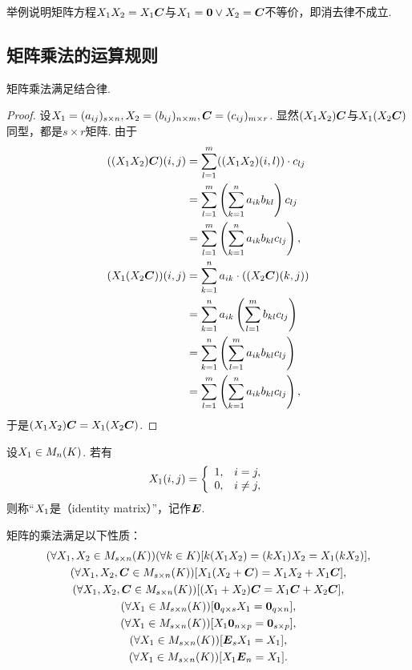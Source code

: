 \begin{example}
举例说明矩阵方程\(X_1 X_2 = X_1 \boldsymbol{C}\)与\(X_1 = \boldsymbol{0} \lor X_2 = \boldsymbol{C}\)不等价，即消去律不成立.
\end{example}

\subsection{矩阵乘法的运算规则}
\begin{theorem}
矩阵乘法满足结合律.
\begin{proof}
设\(X_1 = (a_{ij})_{s \times n},
X_2 = (b_{ij})_{n \times m},
\boldsymbol{C} = (c_{ij})_{m \times r}\).
显然\((X_1X_2)\boldsymbol{C}\)与\(X_1(X_2\boldsymbol{C})\)同型，都是\(s \times r\)矩阵.
由于\begin{align*}
	((X_1X_2)\boldsymbol{C})(i,j)
	&= \sum_{l=1}^m ((X_1X_2)(i,l)) \cdot c_{lj} \\
	&= \sum_{l=1}^m \left( \sum_{k=1}^n a_{ik} b_{kl} \right) c_{lj} \\
	&= \sum_{l=1}^m \left( \sum_{k=1}^n a_{ik} b_{kl} c_{lj} \right), \\
	(X_1(X_2\boldsymbol{C}))(i,j)
	&= \sum_{k=1}^n a_{ik} \cdot ((X_2\boldsymbol{C})(k,j)) \\
	&= \sum_{k=1}^n a_{ik} \left( \sum_{l=1}^m b_{kl} c_{lj} \right) \\
	&= \sum_{k=1}^n \left( \sum_{l=1}^m a_{ik} b_{kl} c_{lj} \right) \\
	&= \sum_{l=1}^m \left( \sum_{k=1}^n a_{ik} b_{kl} c_{lj} \right),
\end{align*}
于是\((X_1X_2)\boldsymbol{C} = X_1(X_2\boldsymbol{C})\).
\end{proof}
\end{theorem}

\begin{definition}
设\(X_1\in M_n(K)\).
若有\[
	X_1(i,j) = \left\{ \begin{array}{cl}
		1, & i=j, \\
		0, & i\neq j,
	\end{array} \right.
\]
则称“\(X_1\)是（identity matrix）”，记作\(\boldsymbol{E}\).
\end{definition}

\begin{property}
矩阵的乘法满足以下性质：
\begin{gather}
	(\forall X_1,X_2\in M_{s\times n}(K))(\forall k\in K)[k(X_1X_2) = (kX_1)X_2 = X_1(kX_2)], \\
	(\forall X_1,X_2,\boldsymbol{C}\in M_{s\times n}(K))[X_1(X_2+\boldsymbol{C}) = X_1X_2 + X_1\boldsymbol{C}], \\
	(\forall X_1,X_2,\boldsymbol{C}\in M_{s\times n}(K))[(X_1+X_2)\boldsymbol{C} = X_1\boldsymbol{C} + X_2\boldsymbol{C}], \\
	(\forall X_1\in M_{s\times n}(K))[\boldsymbol{0}_{q \times s} X_1 = \boldsymbol{0}_{q \times n}], \\
	(\forall X_1\in M_{s\times n}(K))[X_1 \boldsymbol{0}_{n \times p} = \boldsymbol{0}_{s \times p}], \\
	(\forall X_1\in M_{s\times n}(K))[\boldsymbol{E}_s X_1 = X_1], \\
	(\forall X_1\in M_{s\times n}(K))[X_1 \boldsymbol{E}_n = X_1].
\end{gather}
\end{property}

